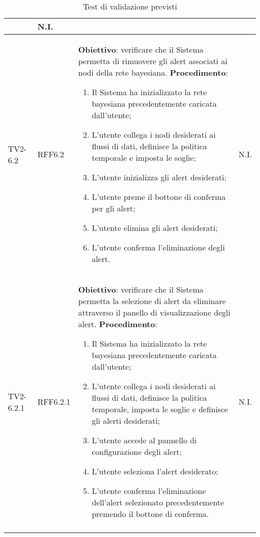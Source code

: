 \begin{longtable}{|C{.15\textwidth}|C{.13\textwidth}|m{.52\textwidth}|C{.08\textwidth}|}
\begin{enumerate}
	\end{enumerate}
	& N.I. \\
\hline
TV2-6.2 & RFF6.2 &
	\textbf{Obiettivo}: verificare che il Sistema permetta di rimuovere gli alert associati ai nodi della rete bayesiana. \newline
	\textbf{Procedimento}:
	\begin{enumerate}
		\item Il Sistema ha inizializzato la rete bayesiana precedentemente caricata dall'utente;
		\item L'utente collega i nodi desiderati ai flussi di dati, definisce la politica temporale e imposta le soglie;
		\item L'utente inizializza gli alert desiderati;
		\item L'utente preme il bottone di conferma per gli alert;
		\item L'utente elimina gli alert desiderati;
		\item L'utente conferma l'eliminazione degli alert.
	\end{enumerate}
	& N.I. \\
\hline
	 TV2-6.2.1 & RFF6.2.1 &
	\textbf{Obiettivo}: verificare che il Sistema permetta la selezione di alert da eliminare attraverso il panello di visualizzazione degli alert. \newline
	\textbf{Procedimento}:
	\begin{enumerate}
		\item Il Sistema ha inizializzato la rete bayesiana precedentemente caricata dall'utente;
		\item L'utente collega i nodi desiderati ai flussi di dati, definisce la politica temporale, imposta le soglie e definisce gli alerti desiderati;
		\item L'utente accede al pannello di configurazione degli alert;
		\item L'utente seleziona l'alert desiderato;
		\item L'utente conferma l'eliminazione dell'alert selezionato precedentemente premendo il bottone di conferma.
	\end{enumerate}
	& N.I. \\
\hline
\caption{Test di validazione previsti}
\label{testvalidazioneprevisti}
\end{longtable}



